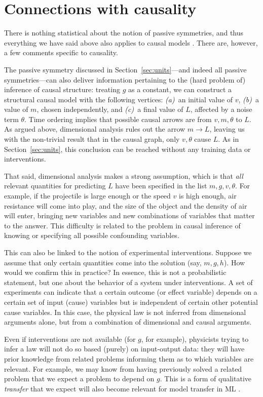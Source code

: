 \documentclass[]{article} %
\newcommand{\sectionname}{Section}
\newcommand{\secref}[1]{\sectionname~\ref{#1}}
\begin{document}
\section{Connections with causality}\label{sec:causality}
There is nothing statistical about the notion of passive symmetries, and thus everything we have said above also applies to causal models \citep{PetJanSch17}.
There are, however, a few comments specific to causality.

The passive symmetry discussed in \secref{sec:units}---and indeed all passive symmetries---can also deliver information pertaining to the (hard problem of) inference of causal structure:
treating $g$ as a constant, we can construct a structural causal model with the following vertices: \textsl{(a)}~an initial value of $v$, \textsl{(b)}~a value of $m$, chosen independently, and \textsl{(c)}~a final value of $L$, affected by a noise term $\theta$.
Time ordering implies that possible causal arrows are from $v, m, \theta$ to $L$.
As argued above, dimensional analysis rules out the arrow $m\to L$, leaving us with the non-trivial result that in the causal graph, only $v,\theta$ cause $L$.
As in \secref{sec:units}, this conclusion can be reached without any training data or interventions.

That said, dimensional analysis makes a strong assumption, which is that \emph{all} relevant quantities for predicting $L$ have been specified in the list $m, g, v, \theta$.
For example, if the projectile is large enough or the speed $v$ is high enough, air resistance will come into play, and the size of the object and the density of air will enter, bringing new variables and new combinations of variables that matter to the answer.
This difficulty is related to the problem in causal inference of knowing or specifying all possible confounding variables.

This can also be linked to the notion of experimental interventions. Suppose we assume that only certain quantities come into the solution (say, $m, g, h$). How would we confirm this in practice? In essence, this is not a probabilistic statement, but one about the behavior of a system under interventions. A set of experiments can indicate that a certain outcome (or effect variable) depends on a certain set of input (cause) variables but is independent of certain other potential cause variables. In this case, the physical law is not inferred from dimensional arguments alone, but from a combination of dimensional and causal arguments.

Even if interventions are not available (for $g$, for example), physicists trying to infer a law will not do so based (purely) on input-output data: they will have prior knowledge from related problems informing them as to which variables are relevant. For example, we may know from having previously solved a related problem that we expect a problem to depend on $g$.
This is a form of qualitative \emph{transfer} that we expect will also become relevant for model transfer in ML \citep{RojSchTurPet18}.
\end{document}
